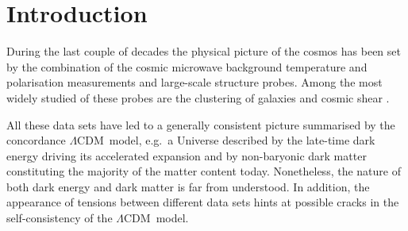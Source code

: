 \documentclass[astrosymb,twocolumn]{aastex631}
\newcommand{\lcdm}{\(\Lambda\)CDM}
\begin{document}


\section{Introduction}
During the last couple of decades the physical picture of the cosmos has been set by the combination of the cosmic microwave background temperature and polarisation measurements \citep{Akrami2018} and large-scale structure probes. Among the most widely studied of these probes are the clustering of galaxies \citep{Beutler:2012px,Contreras_2013, Chuang2017, Mohammad_2018,descollaboration2021dark,prat2021dark,Porredon_2021,derose2021dark,porredon2021dark,pandey2021dark} and cosmic shear \citep{deJong2017,Aihara2019,jeffrey2021dark,secco2021dark,amon2021dark}.

All these data sets have led to a generally consistent picture summarised by the concordance \lcdm\ model, e.g.\ a Universe described by the late-time dark energy driving its accelerated expansion and by non-baryonic dark matter constituting the majority of the matter content today. Nonetheless, the nature of both dark energy and dark matter is far from understood. In addition, the appearance of tensions between different data sets \citep{Spergel2015,Addison2015,Battye2015,Raveri2016,Joudaki2016a,Joudaki2016b,PourtsidouTram2016,Charnock2017,Camera2017a} hints at possible cracks in the self-consistency of the \lcdm\ model.
\end{document}
